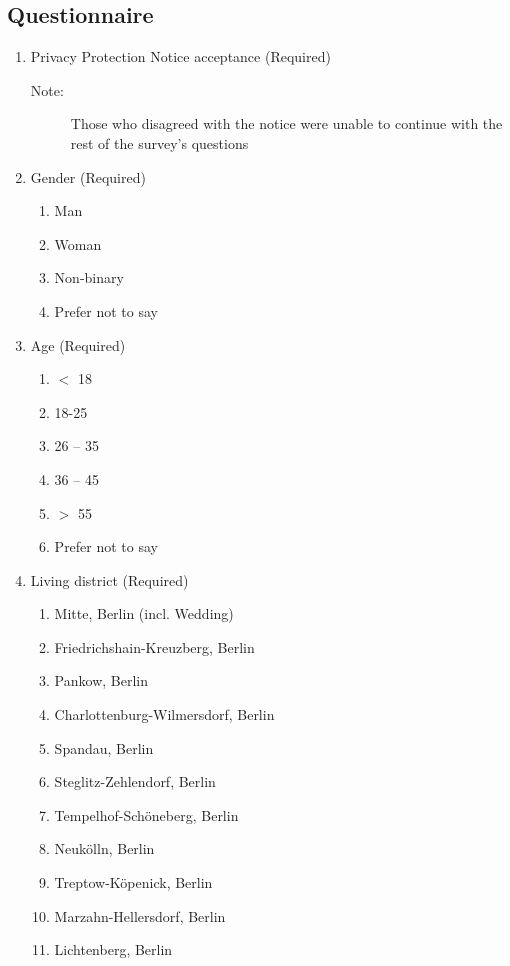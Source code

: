 \subsection*{Questionnaire}
\begin{enumerate}
	\item Privacy Protection Notice acceptance (Required)
	\begin{description}
		\item[Note:] Those who disagreed with the notice were unable to continue with the rest of the survey's questions
	\end{description}
	\item Gender (Required)
	\begin{enumerate}
		\item Man
		\item Woman
		\item Non-binary
		\item Prefer not to say
	\end{enumerate}
	\item Age (Required)
	\begin{enumerate}
		\item $<$ 18
		\item 18-25
		\item 26 – 35
		\item 36 – 45 
		\item $>$ 55
		\item 	Prefer not to say
	\end{enumerate}
	\item Living district (Required)
	\begin{enumerate}
		\item Mitte, Berlin (incl. Wedding) 
		\item	Friedrichshain-Kreuzberg, Berlin
		\item 	Pankow, Berlin
		\item	Charlottenburg-Wilmersdorf, Berlin
		\item	Spandau, Berlin
		\item	Steglitz-Zehlendorf, Berlin
		\item	Tempelhof-Schöneberg, Berlin
		\item	Neukölln, Berlin
		\item	Treptow-Köpenick, Berlin
		\item	Marzahn-Hellersdorf, Berlin
		\item	Lichtenberg, Berlin

\end{enumerate}
\end{enumerate}

